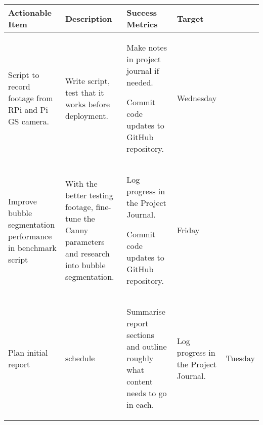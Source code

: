 \begin{table}[!h]
    \centering
    \begin{tabularx}{\textwidth}{|X|X|X|l|}
        \hline
        Actionable Item & Description & Success Metrics & Target \\
        \hline
        \hline
        Script to record footage from RPi and Pi GS camera. &
        \begin{myitemize}
            \item Write script, test that it works before deployment.
        \end{myitemize} &
        \begin{myitemize}
            \item Make notes in project journal if needed.
            \item Commit code updates to GitHub repository.
        \end{myitemize} &
        Wednesday \\
        \hline
        Improve bubble segmentation performance in benchmark script &
        \begin{myitemize}
            \item With the better testing footage, fine-tune the Canny parameters and research into bubble segmentation.
        \end{myitemize} &
        \begin{myitemize}
            \item Log progress in the Project Journal.
            \item Commit code updates to GitHub repository.
        \end{myitemize} &
        Friday \\
        \hline
        Plan initial report & schedule &
        \begin{myitemize}
            \item Summarise report sections and outline roughly what content needs to go in each.
        \end{myitemize} &
        \begin{myitemize}
            \item Log progress in the Project Journal.
        \end{myitemize} &
        Tuesday \\
        \hline
    \end{tabularx}
\end{table}
